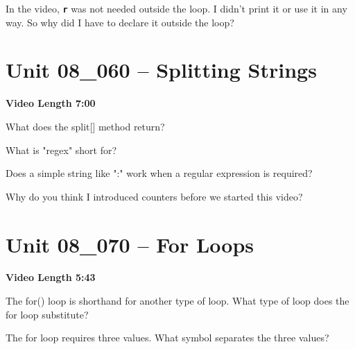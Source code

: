 \documentclass[letterpaper,12pt]{exam}
\newcommand{\unit}{Unit 08}
\begin{document}
\begin{questions}
\begin{samepage}
    \question In the video, \texttt{\textbf{r}} was not needed outside the loop.  I didn't print it or use it in any way.  So why did I have to declare it outside the loop?
    \vspace{5mm}
\end{samepage}



\section*{\unit\_060 -- Splitting Strings} %
\par{\selectfont\textbf{Video Length 7:00}}

\begin{samepage}
    \question What does the split[] method return?
    \vspace{5mm}
\end{samepage}

\begin{samepage}
    \question What is "regex" short for?
    \vspace{5mm}
\end{samepage}

\begin{samepage}
    \question Does a simple string like ":" work when a regular expression is required?
    \vspace{5mm}
\end{samepage}

\begin{samepage}
    \question Why do you think I introduced counters before we started this video?
    \vspace{5mm}
\end{samepage}

\section*{\unit\_070 -- For Loops} %
\par{\selectfont\textbf{Video Length 5:43}}

\begin{samepage}
    \question The for() loop is shorthand for another type of loop.  What type of loop does the for loop substitute?
    \vspace{5mm}
\end{samepage}
\begin{samepage}
    \question The for loop requires three values.  What symbol separates the three values?
    \vspace{5mm}
\end{samepage}


\end{questions}
\end{document}
